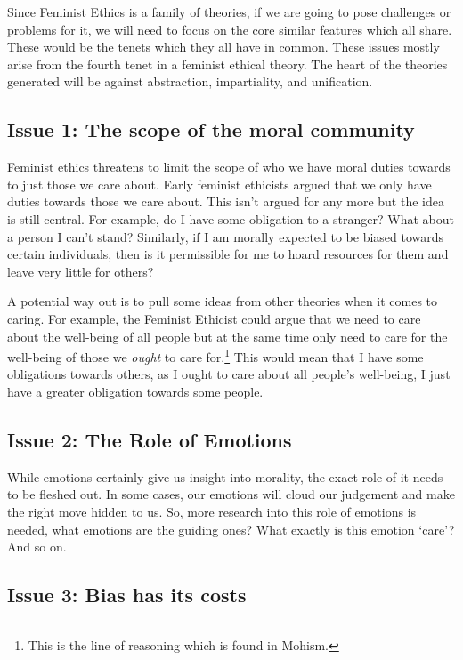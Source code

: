 Since Feminist Ethics is a family of theories, if we are going to pose challenges or problems for it, we will need to focus on the core similar features which all share. These would be the tenets which they all have in common. These issues mostly arise from the fourth tenet in a feminist ethical theory. The heart of the theories generated will be against abstraction, impartiality, and unification.

\subsection{Issue 1: The scope of the moral community}

Feminist ethics threatens to limit the scope of who we have moral duties towards to just those we care about. Early feminist ethicists argued that we only have duties towards those we care about. This isn’t argued for any more but the idea is still central. For example, do I have some obligation to a stranger? What about a person I can’t stand? Similarly, if I am morally expected to be biased towards certain individuals, then is it permissible for me to hoard resources for them and leave very little for others?

A potential way out is to pull some ideas from other theories when it comes to caring. For example, the Feminist Ethicist could argue that we need to care about the well-being of all people but at the same time only need to care for the well-being of those we \emph{ought} to care for.\footnote{This is the line of reasoning which is found in Mohism.} This would mean that I have some obligations towards others, as I ought to care about all people's well-being, I just have a greater obligation towards some people.

\subsection{Issue 2: The Role of Emotions}

While emotions certainly give us insight into morality, the exact role of it needs to be fleshed out. In some cases, our emotions will cloud our judgement and make the right move hidden to us. So, more research into this role of emotions is needed, what emotions are the guiding ones? What exactly is this emotion ‘care’? And so on.

\subsection{Issue 3: Bias has its costs}

